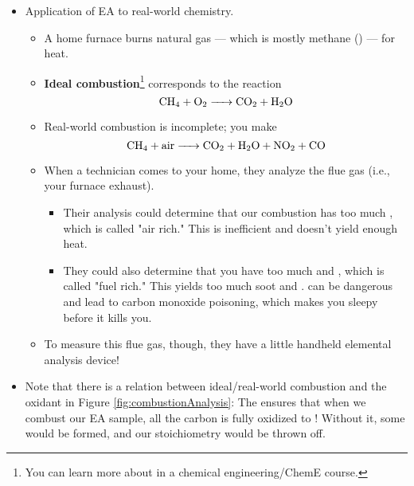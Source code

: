 \documentclass[../notes.tex]{subfiles}
\begin{document}
\begin{itemize}
\begin{itemize}
    \end{itemize}
    \item Application of EA to real-world chemistry.
    \begin{itemize}
        \item A home furnace burns natural gas --- which is mostly methane () --- for heat.
        \item \textbf{Ideal combustion}\footnote{You can learn more about in a chemical engineering/ChemE course.} corresponds to the reaction
        \begin{equation*}
            \ce{CH4 + O2 -> CO2 + H2O}
        \end{equation*}
        \item Real-world combustion is incomplete; you make
        \begin{equation*}
            \ce{CH4 + air -> CO2 + H2O + NO2 + CO}
        \end{equation*}
        \item When a technician comes to your home, they analyze the flue gas (i.e., your furnace exhaust).
        \begin{itemize}
            \item Their analysis could determine that our combustion has too much , which is called "air rich." This is inefficient and doesn't yield enough heat.
            \item They could also determine that you have too much  and , which is called "fuel rich." This yields too much soot and .  can be dangerous and lead to carbon monoxide poisoning, which makes you sleepy before it kills you.
        \end{itemize}
        \item To measure this flue gas, though, they have a little handheld elemental analysis device!
    \end{itemize}
    \item Note that there is a relation between ideal/real-world combustion and the  oxidant in Figure \ref{fig:combustionAnalysis}: The  ensures that when we combust our EA sample, all the carbon is fully oxidized to ! Without it, some  would be formed, and our stoichiometry would be thrown off.
\end{itemize}
\end{document}
